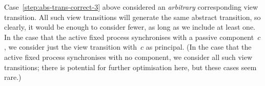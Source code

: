 


\begin{opt}
Case~\ref{step:abs-trans-correct-3} above considered an \emph{arbitrary}
corresponding view transition.  All such view transitions will generate the
same abstract transition, so clearly, it would be enough to consider fewer, as
long as we include at least one.  In the case that the active fixed process
synchronises with a passive component~$c$, we consider just the view
transition with~$c$ as principal.  (In the case that the active fixed process
synchronises with no component, we consider all such view transitions; there
is potential for further optimisation here, but these cases seem rare.)
\end{opt}


